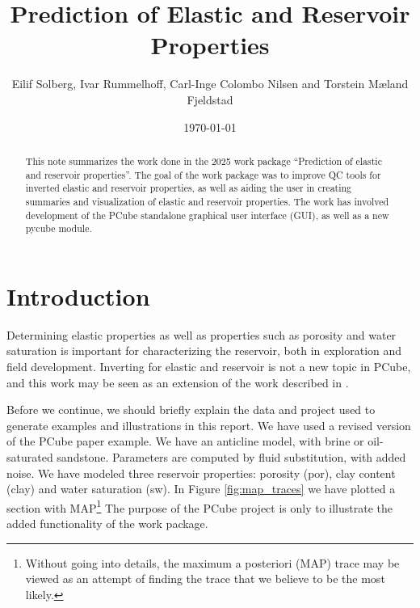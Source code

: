 \documentclass[note,screen,english,12pt,utf8]{nrdoc}
\begin{document}
\title{Prediction of Elastic and Reservoir Properties}
\author{Eilif Solberg, Ivar Rummelhoff, Carl-Inge Colombo Nilsen and Torstein Mæland Fjeldstad}
\date{\today}

\maketitle

\begin{abstract}
This note summarizes the work done in the 2025 work package
``Prediction of elastic and reservoir properties''. The goal of the work package
was to improve QC tools for inverted elastic and reservoir properties, as well as aiding
the user in creating summaries and visualization of elastic and reservoir properties.
The work has involved development of the PCube standalone graphical user interface (GUI),
as well as a new pycube module.
\end{abstract}

\tableofcontents %

\section{Introduction}

Determining elastic properties as well as properties such as
porosity and water saturation is important for characterizing
the reservoir, both in exploration and field development.
Inverting for elastic and reservoir is not a new topic in PCube,
and this work may be seen as an extension of the work described
in \cite{Aker2023}.

Before we continue, we should briefly explain the data and
project used to generate examples and illustrations in this report.
We have used a revised version of the PCube paper
example. We have an anticline model, with brine or oil-saturated
sandstone. Parameters are computed by fluid substitution, with
added noise. We have modeled three reservoir properties:
porosity (por), clay content (clay) and water saturation (sw). In Figure
\ref{fig:map_traces} we have plotted a section with MAP\footnote{
    Without going into details, the maximum a posteriori (MAP) trace may
    be viewed as an attempt of finding the trace that we believe to be
    the most likely.
}
The purpose of the PCube project is only to illustrate the added
functionality of the work package.
\end{document}
